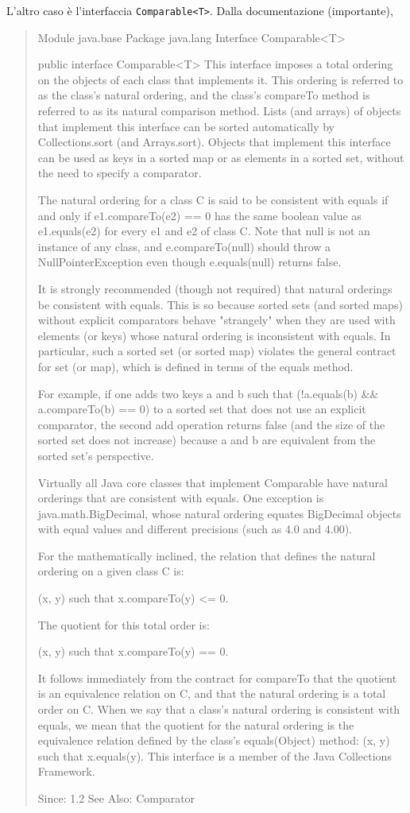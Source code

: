 \documentclass[\fontsizeclass,twocolumn]{\classname}
\theoremstyle{definition}
\theoremstyle{definition}
\begin{document}
L'altro caso è l'interfaccia \texttt{Comparable<T>}. Dalla documentazione
(importante),
\begin{quote}
    \footnotesize{Module java.base
Package java.lang
Interface Comparable<T>

public interface Comparable<T>
This interface imposes a total ordering on the objects of each class that implements it. This ordering is referred to as the class's natural ordering, and the class's compareTo method is referred to as its natural comparison method.
Lists (and arrays) of objects that implement this interface can be sorted automatically by Collections.sort (and Arrays.sort). Objects that implement this interface can be used as keys in a sorted map or as elements in a sorted set, without the need to specify a comparator.

The natural ordering for a class C is said to be consistent with equals if and only if e1.compareTo(e2) == 0 has the same boolean value as e1.equals(e2) for every e1 and e2 of class C. Note that null is not an instance of any class, and e.compareTo(null) should throw a NullPointerException even though e.equals(null) returns false.

It is strongly recommended (though not required) that natural orderings be consistent with equals. This is so because sorted sets (and sorted maps) without explicit comparators behave "strangely" when they are used with elements (or keys) whose natural ordering is inconsistent with equals. In particular, such a sorted set (or sorted map) violates the general contract for set (or map), which is defined in terms of the equals method.

For example, if one adds two keys a and b such that (!a.equals(b) \&\& a.compareTo(b) == 0) to a sorted set that does not use an explicit comparator, the second add operation returns false (and the size of the sorted set does not increase) because a and b are equivalent from the sorted set's perspective.

Virtually all Java core classes that implement Comparable have natural orderings that are consistent with equals. One exception is java.math.BigDecimal, whose natural ordering equates BigDecimal objects with equal values and different precisions (such as 4.0 and 4.00).

For the mathematically inclined, the relation that defines the natural ordering on a given class C is:


       (x, y) such that x.compareTo(y) <= 0.
 
The quotient for this total order is:

       (x, y) such that x.compareTo(y) == 0.
 
It follows immediately from the contract for compareTo that the quotient is an equivalence relation on C, and that the natural ordering is a total order on C. When we say that a class's natural ordering is consistent with equals, we mean that the quotient for the natural ordering is the equivalence relation defined by the class's equals(Object) method:
     (x, y) such that x.equals(y). 
This interface is a member of the Java Collections Framework.

Since:
1.2
See Also:
Comparator
}
\end{quote}
\end{document}
